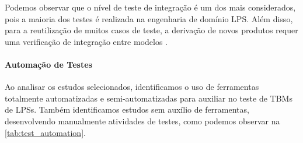 Podemos observar que o nível de teste de integração é um dos mais considerados, pois a maioria dos testes é realizada na engenharia de domínio LPS. Além disso, para a reutilização de muitos casos de teste, a derivação de novos produtos requer uma verificação de integração entre modelos \cite{samih2014mplm, oster2011pairwise, samih2014deriving, oster2012feature, olimpiew2005model, cichos2011model, devroey2014coverage, varshosaz2015delta, samih2012relating, dukaczewski2013requirements, Garcia_et_al2010, wang2013automated, devroey2014behavioural, cai2013model} .



\paragraph{\textbf{Automação de Testes}}

Ao analisar os estudos selecionados, identificamos o uso de ferramentas totalmente automatizadas e semi-automatizadas para auxiliar no teste de TBMs de LPSs. Também identificamos estudos sem auxílio de ferramentas, desenvolvendo manualmente atividades de testes, como podemos observar na \ref{tab:test_automation}.


